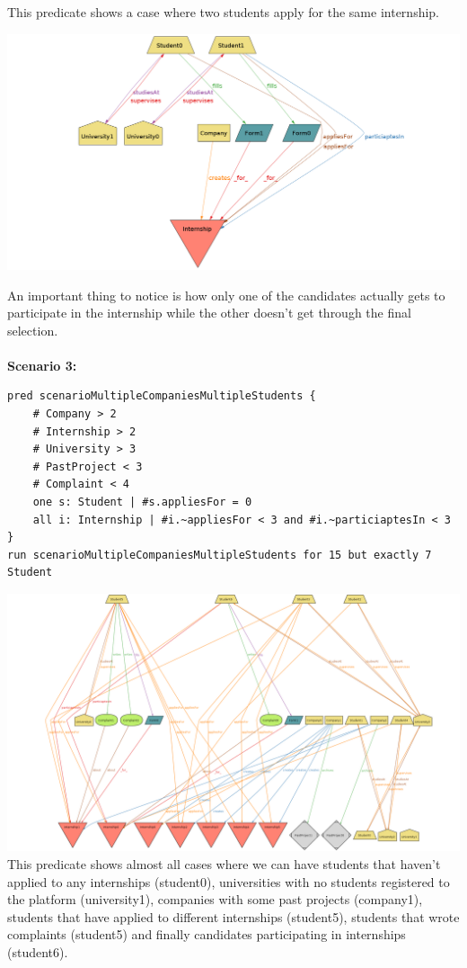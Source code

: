 \documentclass[11pt,twoside]{article}
\begin{document}
This predicate shows a case where two students apply for the same internship.
\begin{center}
\includegraphics[width=\textwidth]{Images/Scenario2}
\end{center}
An important thing to notice is how only one of the candidates actually gets to participate in the internship while the other doesn't get through the final selection. \\
\vspace{1\baselineskip} \\
\textbf{Scenario 3:}
{\small
\begin{verbatim}
pred scenarioMultipleCompaniesMultipleStudents {
    # Company > 2
    # Internship > 2
    # University > 3
    # PastProject < 3
    # Complaint < 4
    one s: Student | #s.appliesFor = 0
    all i: Internship | #i.~appliesFor < 3 and #i.~particiaptesIn < 3
}
run scenarioMultipleCompaniesMultipleStudents for 15 but exactly 7 Student
\end{verbatim}}
\includegraphics[width=\textwidth]{Images/Scenario3}
This predicate shows almost all cases where we can have students that haven't applied to any internships (student0), universities with no students registered to the platform (university1), companies with some past projects (company1), students that have applied to different internships (student5), students that wrote complaints (student5) and finally candidates participating in internships (student6).
\end{document}
